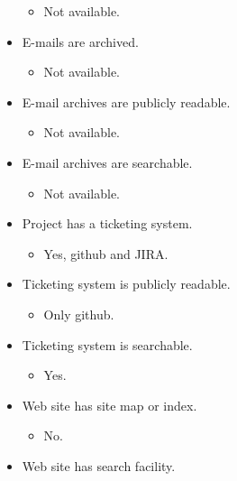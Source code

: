 \begin{itemize}
  \begin{itemize}
  \itemsep1pt\parskip0pt
  \item
    Not available.
  \end{itemize}
\item
  E-mails are archived.

  \begin{itemize}
  \itemsep1pt\parskip0pt
  \item
    Not available.
  \end{itemize}
\item
  E-mail archives are publicly readable.

  \begin{itemize}
  \itemsep1pt\parskip0pt
  \item
    Not available.
  \end{itemize}
\item
  E-mail archives are searchable.

  \begin{itemize}
  \itemsep1pt\parskip0pt
  \item
    Not available.
  \end{itemize}
\item
  Project has a ticketing system.

  \begin{itemize}
  \itemsep1pt\parskip0pt
  \item
    Yes, github and JIRA.
  \end{itemize}
\item
  Ticketing system is publicly readable.

  \begin{itemize}
  \itemsep1pt\parskip0pt
  \item
    Only github.
  \end{itemize}
\item
  Ticketing system is searchable.

  \begin{itemize}
  \itemsep1pt\parskip0pt
  \item
    Yes.
  \end{itemize}
\item
  Web site has site map or index.

  \begin{itemize}
  \itemsep1pt\parskip0pt
  \item
    No.
  \end{itemize}
\item
  Web site has search facility.


\end{itemize}
